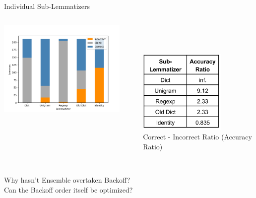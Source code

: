\documentclass[aspectratio=169,xcolor=dvipsnames]{beamer}
\begin{document}
\begin{frame}[t]{Individual Sub-Lemmatizers}
    \begin{columns}
        \begin{column}{0.6\textwidth}
           \includegraphics[width=0.9\textwidth]{sub_lemmatizer_performance.png}
        \end{column}
        
        \begin{column}{0.3\textwidth}
        \\ \ \\ \ \\
            \centering
            \includegraphics[width=0.7\textwidth]{accuracy_ratios_v5.png} \ \\
            \footnotesize
            Correct - Incorrect Ratio (Accuracy Ratio) \\
        \end{column}
    \end{columns} \ \\
    {\Large Why hasn't Ensemble overtaken Backoff?}\\
    Can the Backoff order itself be optimized?
\end{frame}
\end{document}
